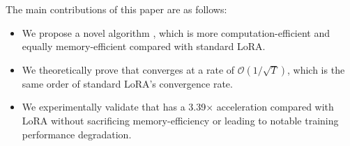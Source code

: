 The main contributions of this paper are as follows:

\begin{itemize}[topsep=5pt, leftmargin=1em]

    \vspace{-0.5em}
    \item We propose a novel algorithm \celora, which is more computation-efficient and equally memory-efficient compared with standard LoRA.

    \item We theoretically prove that \celora converges at a rate of $\mathcal{O}(1/\sqrt{T})$, which is the same order of standard LoRA's convergence rate.

    \item We experimentally validate that \celora has a 3.39$\times$ acceleration compared with LoRA without sacrificing memory-efficiency or leading to notable training performance degradation.
\end{itemize}

